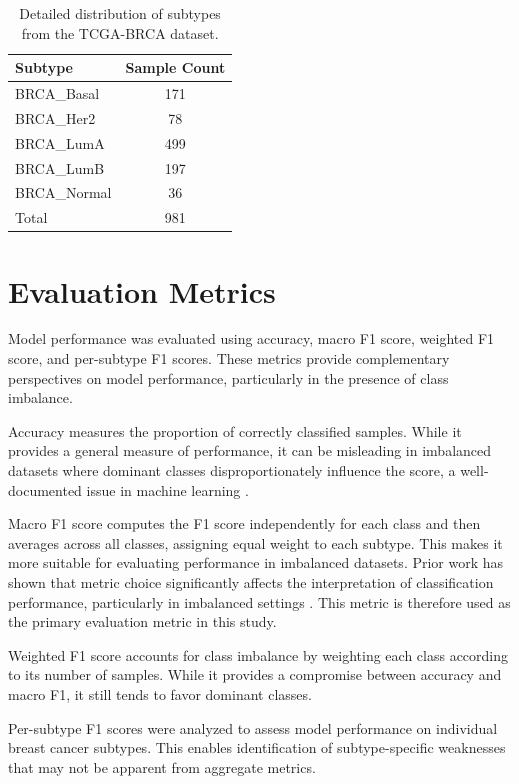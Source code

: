 \documentclass[10pt,twocolumn,letterpaper]{article}
\begin{document}
\begin{table}[H]
    \centering
    \caption{Detailed distribution of subtypes from the TCGA-BRCA dataset.}
    \label{tab:dataset}
    \begin{tabular}{lc}
        \toprule
        \textbf{Subtype} & \textbf{Sample Count} \\
        \midrule
        BRCA\_Basal  & 171 \\
        BRCA\_Her2   & 78 \\
        BRCA\_LumA   & 499 \\
        BRCA\_LumB   & 197 \\
        BRCA\_Normal & 36 \\
        \midrule
        Total        & 981 \\
        \bottomrule
    \end{tabular}
\end{table}

\FloatBarrier
\section{Evaluation Metrics}

Model performance was evaluated using accuracy, macro F1 score, weighted F1 score, and per-subtype F1 scores. These metrics provide complementary perspectives on model performance, particularly in the presence of class imbalance.

Accuracy measures the proportion of correctly classified samples. While it provides a general measure of performance, it can be misleading in imbalanced datasets where dominant classes disproportionately influence the score, a well-documented issue in machine learning \cite{he2009}.

Macro F1 score computes the F1 score independently for each class and then averages across all classes, assigning equal weight to each subtype. This makes it more suitable for evaluating performance in imbalanced datasets. Prior work has shown that metric choice significantly affects the interpretation of classification performance, particularly in imbalanced settings \cite{sokolova2009}. This metric is therefore used as the primary evaluation metric in this study.

Weighted F1 score accounts for class imbalance by weighting each class according to its number of samples. While it provides a compromise between accuracy and macro F1, it still tends to favor dominant classes.

Per-subtype F1 scores were analyzed to assess model performance on individual breast cancer subtypes. This enables identification of subtype-specific weaknesses that may not be apparent from aggregate metrics.
\end{document}
